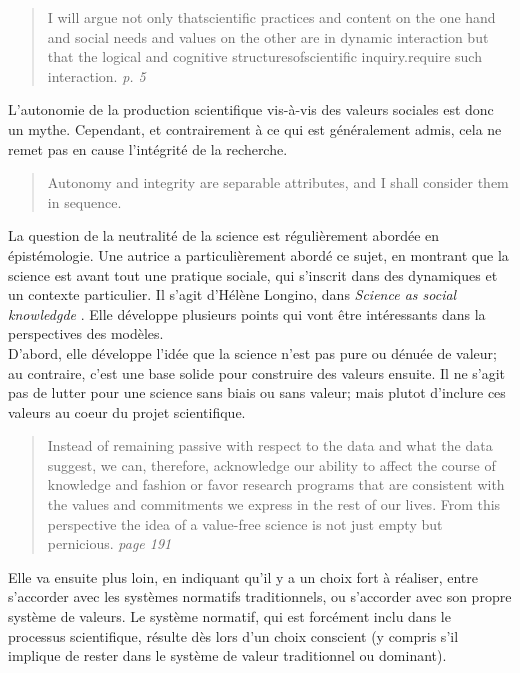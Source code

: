 \begin{quote}
    I will argue not only thatscientific practices and content on the one hand and social needs and values on the other are in dynamic interaction but that the logical and cognitive structuresofscientific inquiry.require such interaction. \textit{p. 5}
\end{quote}

L'autonomie de la production scientifique vis-à-vis des valeurs sociales est donc un mythe. Cependant, et contrairement à ce qui est généralement admis, cela ne remet pas en cause l'intégrité de la recherche. 

\begin{quote}
    Autonomy and integrity are separable attributes, and I shall consider them in sequence.
\end{quote}

La question de la neutralité de la science est régulièrement abordée en épistémologie. Une autrice a particulièrement abordé ce sujet, en montrant que la science est avant tout une pratique sociale, qui s'inscrit dans des dynamiques et un contexte particulier. Il s'agit d'Hélène Longino, dans \emph{Science as social knowledgde} \cite{longino_science_1990}. Elle développe plusieurs points qui vont être intéressants dans la perspectives des modèles. \\

D'abord, elle développe l'idée que la science n'est pas pure ou dénuée de valeur; au contraire, c'est une base solide pour construire des valeurs ensuite. Il ne s'agit pas de lutter pour une science sans biais ou sans valeur; mais plutot d'inclure ces valeurs au coeur du projet scientifique. 

\begin{quote}
    Instead of remaining passive with respect to the data and what the data suggest, we can, therefore, acknowledge our ability to affect the course of knowledge and fashion or favor research programs that are consistent with the values and commitments we express in the rest of our lives. From this perspective the idea of a value-free science is not just empty but pernicious. \textit{page 191}
\end{quote}

Elle va ensuite plus loin, en indiquant qu'il y a un choix fort à réaliser, entre s'accorder avec les systèmes normatifs traditionnels, ou s'accorder avec son propre système de valeurs. Le système normatif, qui est forcément inclu dans le processus scientifique, résulte dès lors d'un choix conscient (y compris s'il implique de rester dans le système de valeur traditionnel ou dominant). 

